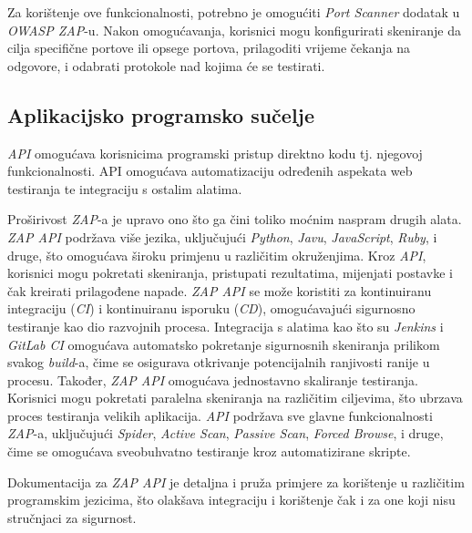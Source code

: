 Za korištenje ove funkcionalnosti, potrebno je omogućiti \textit{Port Scanner} dodatak u \textit{OWASP ZAP}-u. 
Nakon omogućavanja, korisnici mogu konfigurirati skeniranje da cilja specifične portove ili opsege portova, prilagoditi vrijeme 
čekanja na odgovore, i odabrati protokole nad kojima će se testirati.\cite{zap_feat}

\subsection{Aplikacijsko programsko sučelje}
\textit{API} omogućava korisnicima programski pristup direktno kodu tj. njegovoj funkcionalnosti. API omogućava automatizaciju određenih aspekata web testiranja te 
integraciju s ostalim alatima.

Proširivost \textit{ZAP}-a je upravo ono što ga čini toliko moćnim naspram drugih alata. \textit{ZAP API} podržava više jezika, uključujući \textit{Python}, \textit{Javu}, \textit{JavaScript}, \textit{Ruby}, i druge, što omogućava široku primjenu u različitim okruženjima. 
Kroz \textit{API}, korisnici mogu pokretati skeniranja, pristupati rezultatima, mijenjati postavke i čak kreirati prilagođene napade.
\textit{ZAP API} se može koristiti za kontinuiranu integraciju (\textit{CI}) i kontinuiranu isporuku (\textit{CD}), omogućavajući sigurnosno testiranje kao dio razvojnih procesa. 
Integracija s alatima kao što su \textit{Jenkins} i \textit{GitLab CI} omogućava automatsko pokretanje sigurnosnih skeniranja prilikom svakog \textit{build}-a, čime se osigurava otkrivanje potencijalnih ranjivosti ranije u procesu.
Također, \textit{ZAP API} omogućava jednostavno skaliranje testiranja. Korisnici mogu pokretati paralelna skeniranja na različitim ciljevima, što ubrzava proces testiranja velikih aplikacija. 
\textit{API} podržava sve glavne funkcionalnosti \textit{ZAP}-a, uključujući \textit{Spider}, \textit{Active Scan}, \textit{Passive Scan}, \textit{Forced Browse}, i druge, čime se omogućava sveobuhvatno testiranje kroz automatizirane skripte.

Dokumentacija za \textit{ZAP API} je detaljna i pruža primjere za korištenje u različitim programskim jezicima, što olakšava integraciju i korištenje čak i za one koji nisu stručnjaci za sigurnost.\cite{zap_feat}

